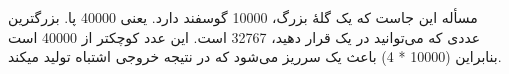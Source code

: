\section{}
\paragraph{}\label{answer:1}
مسأله این جاست که یک گلهٔ بزرگ، 10000 گوسفند دارد. یعنی 40000 پا. بزرگترین عددی که می‌توانید در یک  قرار دهید، 32767 است. این عدد کوچکتر از 40000 است بنابراین (10000 * 4) باعث یک سرریز می‌شود که در نتیجه خروجی اشتباه تولید میکند.